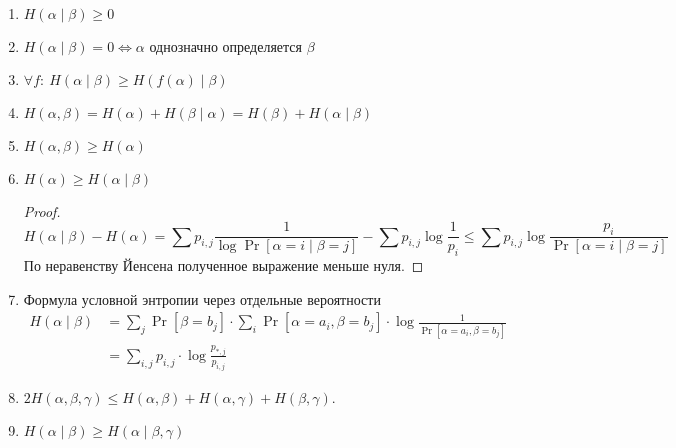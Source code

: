 \begin{prop}
    ~\begin{enumerate}
		\item $ H( \alpha \mid \beta ) \ge  0$
		\item $ H( \alpha  \mid \beta ) = 0 \Longleftrightarrow \alpha  \text{ однозначно определяется } \beta $
		\item $ \forall f \colon ~ H( \alpha  \mid \beta  ) \ge  H( f( \alpha ) \mid \beta )$
		\item $ H( \alpha , \beta ) = H( \alpha ) + H( \beta  \mid \alpha ) = H(  \beta ) + H( \alpha \mid \beta )$
		\item $ H( \alpha , \beta ) \ge H( \alpha )$
		\item $ H( \alpha ) \ge  H ( \alpha \mid \beta )$
			\begin{proof}
			    \[
				H( \alpha \mid \beta ) - H ( \alpha ) = \sum_{ }^{ } p_{i, j} \frac{1}{\log \Pr [ \alpha  = i \mid \beta  = j]} - \sum_{ }^{ } p_{i, j} \log \frac{1}{p_i} \le  \sum_{ }^{ } p_{i, j} \log \frac{p_i}{\Pr [ \alpha = i \mid \beta  = j]} 
			    \] 
				По неравенству Йенсена полученное выражение меньше нуля.
			\end{proof}
		\item Формула условной энтропии через отдельные вероятности
			\begin{align*}
				H( \alpha \mid \beta ) &= \sum_{j} \Pr[ \beta = b_j] \cdot  \sum_{i}^{} \Pr[ \alpha = a_i, \beta = b_j] \cdot \log \frac{1}{\Pr[ \alpha = a_i, \beta = b_j]} \\
									   &= \sum_{i, j}^{} p_{i,j} \cdot \log \frac{p_{*, j}}{p_{i, j}}
			\end{align*}
		\item 
			$ 2H( \alpha , \beta , \gamma ) ≤ H( \alpha , \beta ) + H( \alpha,  \gamma ) + H( \beta , \gamma ).$
		\item $ H( \alpha \mid \beta) \ge H( \alpha  \mid \beta, \gamma ) $
    \end{enumerate} 
\end{prop}

